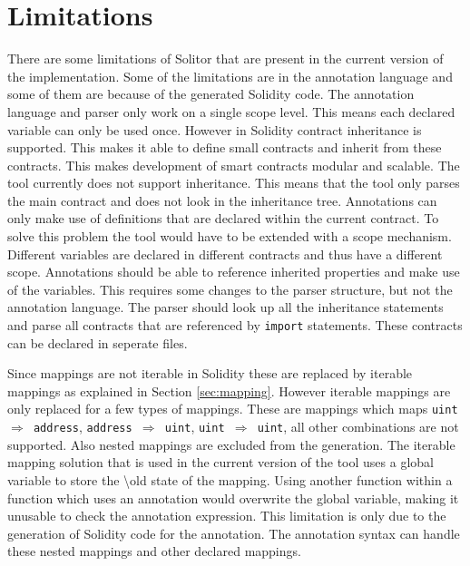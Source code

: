 \documentclass[a4paper]{article}
\begin{document}
\newpage
\section{Limitations}
\label{sec:limitations}
There are some limitations of Solitor that are present in the current version of the implementation. Some of the limitations are in the annotation language and some of them are because of the generated Solidity code. The annotation language and parser only work on a single scope level. This means each declared variable can only be used once. However in Solidity contract inheritance is supported. This makes it able to define small contracts and inherit from these contracts. This makes development of smart contracts modular and scalable. The tool currently does not support inheritance. This means that the tool only parses the main contract and does not look in the inheritance tree. Annotations can only make use of definitions that are declared within the current contract. To solve this problem the tool would have to be extended with a scope mechanism. Different variables are declared in different contracts and thus have a different scope. Annotations should be able to reference inherited properties and make use of the variables. This requires some changes to the parser structure, but not the annotation language. The parser should look up all the inheritance statements and parse all contracts that are referenced by \texttt{import} statements. These contracts can be declared in seperate files. \par
Since mappings are not iterable in Solidity these are replaced by iterable mappings as explained in Section \ref{sec:mapping}. However iterable mappings are only replaced for a few types of mappings. These are mappings which maps \texttt{uint $\Rightarrow$ address}, \texttt{address $\Rightarrow$ uint}, \texttt{uint $\Rightarrow$ uint}, all other combinations are not supported. Also nested mappings are excluded from the generation. The iterable mapping solution that is used in the current version of the tool uses a global variable to store the \textbackslash old state of the mapping. Using another function within a function which uses an  annotation would overwrite the global variable, making it unusable to check the annotation expression. This limitation is only due to the generation of Solidity code for the annotation. The annotation syntax can handle these nested mappings and other declared mappings. \par
\end{document}
